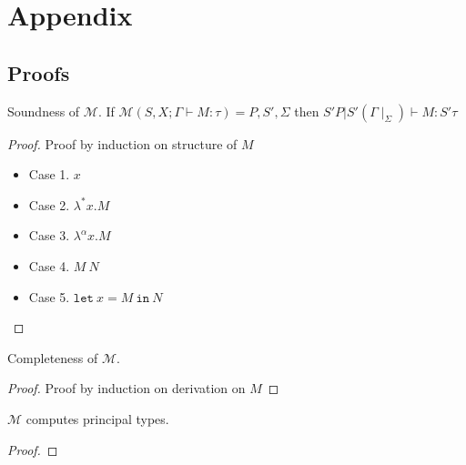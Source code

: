 \chapter{Appendix}

\section{Proofs}

\begin{theorem}
  Soundness of $\mathcal{M}$. If $\mathcal{M}(S, X; \Gamma \vdash M : \tau) = P, S', \Sigma$ then $S' P | S' (\Gamma\mid_{\Sigma}) \vdash M : S' \tau$
\end{theorem}

\begin{proof}
  Proof by induction on structure of $M$
\begin{itemize}
\item Case 1. $x$
\item Case 2. $\lambda^{*} x. M$
\item Case 3. $\lambda ^{\alpha}x. M$
\item Case 4. $M\ N$
\item Case 5. $\texttt{let}\ x = M\ \texttt{in}\ N$
\end{itemize}

\end{proof}

\begin{theorem}
  Completeness of $\mathcal{M}$.
\end{theorem}
\begin{proof}
Proof by induction on derivation on $M$
\end{proof}

\begin{theorem}
  $\mathcal{M}$ computes principal types.
\end{theorem}
\begin{proof}

\end{proof}
